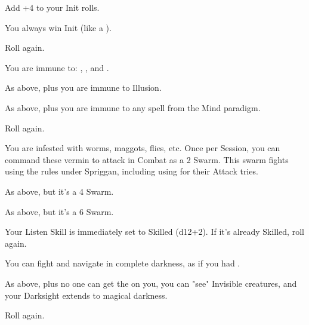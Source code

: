 \begin{multicols*}{2}


\NC[Name=Twitchy]

 Add +4 to your Init rolls.

 You always win Init (like a ).

 Roll again.


\cbreak

\NC[Name=Wut?]

 You are immune to: , , and .

 As above, plus you are immune to Illusion.

 As above, plus you are immune to any spell from the Mind paradigm.

 Roll again.


\newpage



\NC[Name=Babies!]

 You are infested with worms, maggots, flies, etc.  Once per Session, you can command these vermin to attack in Combat as a 2 \HD Swarm.  This swarm fights using the rules under Spriggan, including using \PRE for their Attack tries.

 As above, but it's a 4 \HD Swarm.

 As above, but it's a 6 \HD Swarm.

\NC[Name=Bat Ears]

  Your Listen Skill is immediately set to Skilled (d12+2).  If it's already Skilled, roll again.

  You can fight and navigate in complete darkness, as if you had .

  As above, plus no one can get the  on you, you can "see" Invisible creatures, and your Darksight extends to magical darkness.

  Roll again.


\NC[Name=Beardy]
	

\end{multicols*}
